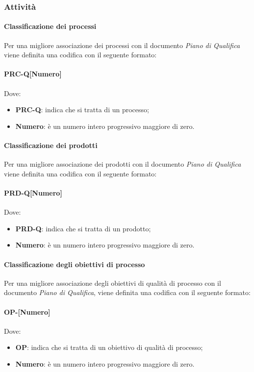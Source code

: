 \subsubsection{Attività}
\paragraph{Classificazione dei processi}
Per una migliore associazione dei processi con il documento \textit{Piano di Qualifica} viene definita una codifica con il seguente formato: \\
\\ \textbf{PRC-Q[Numero]} \\
\\ Dove:
\begin{itemize}
	\item \textbf{PRC-Q}: indica che si tratta di un processo;
	\item \textbf{Numero}: è un numero intero progressivo maggiore di zero.
\end{itemize}

\paragraph{Classificazione dei prodotti}
Per una migliore associazione dei prodotti con il documento \textit{Piano di Qualifica} viene definita una codifica con il seguente formato: \\
\\ \textbf{PRD-Q[Numero]} \\
\\ Dove:
\begin{itemize}
	\item \textbf{PRD-Q}: indica che si tratta di un prodotto;
	\item \textbf{Numero}: è un numero intero progressivo maggiore di zero.
\end{itemize}

\paragraph{Classificazione degli obiettivi di processo}
Per una migliore associazione degli obiettivi di qualità di processo con il documento \textit{Piano di Qualifica}, viene definita una codifica con il seguente formato: \\
\\ \textbf{OP-[Numero]} \\
\\ Dove:
\begin{itemize}
	\item \textbf{OP}: indica che si tratta di un obiettivo di qualità di processo;
	\item \textbf{Numero}: è un numero intero progressivo maggiore di zero.
\end{itemize}

